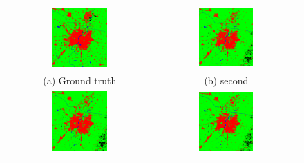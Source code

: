 \documentclass[12pt, a4paper]{report}
\begin{document}
\begin{figure}
\begin{center}
\begin{tabular}{cc}
  \includegraphics[width=0.4\textwidth]{test_gt} &   \includegraphics[width=0.4\textwidth]{test_cnn} \\
(a) Ground truth & (b) second \\[6pt]
 \includegraphics[width=0.4\textwidth]{test_cnn} &   \includegraphics[width=0.4\textwidth]{test_cnn} \\

\end{tabular}
\end{center}
\end{figure}
\end{document}
